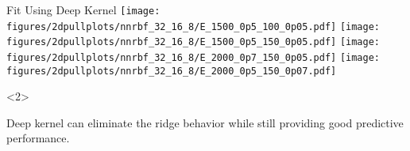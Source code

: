 \documentclass[10pt]{beamer}
\begin{document}
\begin{frame}{Fit Using Deep Kernel}
  \makegrid%
  {}%
  {\texttt{[image: figures/2dpullplots/nnrbf\_32\_16\_8/E\_1500\_0p5\_100\_0p05.pdf]}}%
  {\texttt{[image: figures/2dpullplots/nnrbf\_32\_16\_8/E\_1500\_0p5\_150\_0p05.pdf]}}%
  { }%
  {\texttt{[image: figures/2dpullplots/nnrbf\_32\_16\_8/E\_2000\_0p7\_150\_0p05.pdf]}}%
  {\texttt{[image: figures/2dpullplots/nnrbf\_32\_16\_8/E\_2000\_0p5\_150\_0p07.pdf]}}%

  \begin{onlyenv}<2>
    \begin{beamerpopover}
      \begin{block}{}
        Deep kernel can eliminate the ridge behavior while still providing good predictive performance. 
      \end{block}
    \end{beamerpopover}
  \end{onlyenv}
\end{frame}
\end{document}
